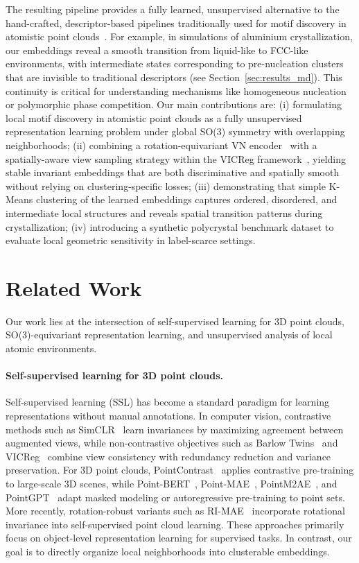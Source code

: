 \documentclass[runningheads]{llncs}
\begin{document}
The resulting pipeline provides a fully learned, unsupervised alternative to the hand-crafted, descriptor-based pipelines traditionally used for motif discovery in atomistic point clouds~\cite{steinhardt1983bond,lechner2008accurate,bartok2013representing,becker2022nucleation}. For example, in simulations of aluminium crystallization, our embeddings reveal a smooth transition from liquid-like to FCC-like environments, with intermediate states corresponding to pre-nucleation clusters that are invisible to traditional descriptors (see Section~\ref{sec:results_md}). This continuity is critical for understanding mechanisms like homogeneous nucleation or polymorphic phase competition.
Our main contributions are: (i) formulating local motif discovery in atomistic point clouds as a fully unsupervised representation learning problem under global SO(3) symmetry with overlapping neighborhoods; (ii) combining a rotation-equivariant VN encoder~\cite{Deng2021VN} with a spatially-aware view sampling strategy within the VICReg framework~\cite{bardes2022vicreg}, yielding stable invariant embeddings that are both discriminative and spatially smooth without relying on clustering-specific losses;
(iii) demonstrating that simple K-Means clustering of the learned embeddings captures ordered, disordered, and intermediate local structures and reveals spatial transition patterns during crystallization; (iv) introducing a synthetic polycrystal benchmark dataset to evaluate local geometric sensitivity in label-scarce settings.

\section{Related Work}

Our work lies at the intersection of self-supervised learning for 3D point clouds, SO(3)-equivariant representation learning, and unsupervised analysis of local atomic environments.

\paragraph{Self-supervised learning for 3D point clouds.}
Self-supervised learning (SSL) has become a standard paradigm for learning representations without manual annotations. In computer vision, contrastive methods such as SimCLR~\cite{chen2020simclr} learn invariances by maximizing agreement between augmented views, while non-contrastive objectives such as Barlow Twins~\cite{zbontar2021barlow} and VICReg~\cite{bardes2022vicreg} combine view consistency with redundancy reduction and variance preservation. For 3D point clouds, PointContrast~\cite{xie2020pointcontrast} applies contrastive pre-training to large-scale 3D scenes, while Point-BERT~\cite{yu2022pointbert}, Point-MAE~\cite{pang2022pointmae}, PointM2AE~\cite{pointM2AE}, and PointGPT~\cite{chenPointGPT} adapt masked modeling or autoregressive pre-training to point sets. More recently, rotation-robust variants such as RI-MAE~\cite{Su2024RIMAERM} incorporate rotational invariance into self-supervised point cloud learning. These approaches primarily focus on object-level representation learning for supervised tasks. In contrast, our goal is to directly organize local neighborhoods into clusterable embeddings.
\end{document}
